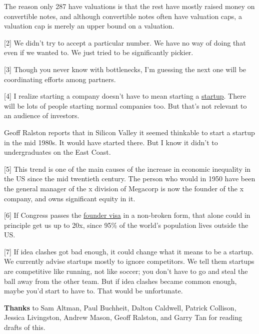 The reason only 287 have valuations is that the
                  rest have mostly raised money on convertible notes, and
                  although convertible notes often have valuation caps, a
                  valuation cap is merely an upper bound on a valuation.

[2] We didn't try to accept a particular number. We have no way
                  of doing that even if we wanted to. We just tried to be
                  significantly pickier.

[3] Though you never know with bottlenecks, I'm guessing the
                  next one will be coordinating efforts among partners.

[4] I realize starting a company doesn't have to mean starting
                  a \href{http://www.paulgraham.com/growth.html}{startup}. There will be lots of
                  people starting normal companies too. But that's not relevant
                  to an audience of investors.

Geoff Ralston reports
                  that in Silicon Valley it seemed thinkable to start a startup
                  in the mid 1980s. It would have started there. But I know it
                  didn't to undergraduates on the East Coast.

[5] This trend is one of the main causes of the increase in
                  economic inequality in the US since the mid twentieth century.
                  The person who would in 1950 have been the general manager of
                  the x division of Megacorp is now the founder of the x
                  company, and owns significant equity in it.

[6] If Congress passes the
                  \href{http://www.paulgraham.com/foundervisa.html}{founder visa} in a non-broken
                  form, that alone could in principle get us up to 20x, since
                  95\% of the world's population lives outside the US.

[7] If idea clashes got bad enough, it could change what it
                  means to be a startup. We currently advise startups mostly to
                  ignore competitors. We tell them startups are competitive like
                  running, not like soccer; you don't have to go and steal the
                  ball away from the other team. But if idea clashes became
                  common enough, maybe you'd start to have to. That would be
                  unfortunate.

\textbf{Thanks} to Sam Altman, Paul
                  Buchheit, Dalton Caldwell, Patrick Collison, Jessica
                  Livingston, Andrew Mason, Geoff Ralston, and Garry Tan for
                  reading drafts of this.


              
            
          
            
              
                


                  
              
            
          

